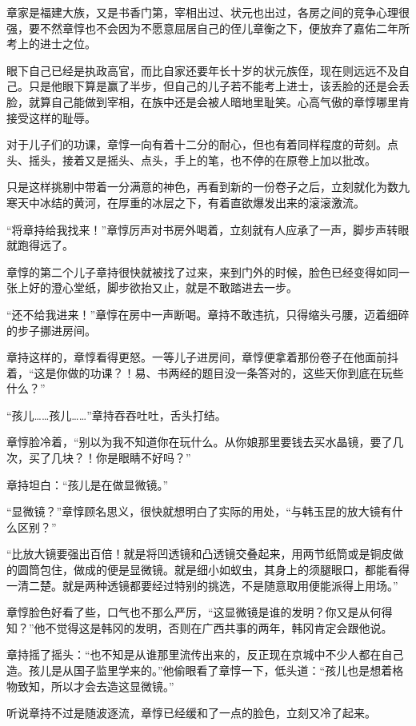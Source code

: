 章家是福建大族，又是书香门第，宰相出过、状元也出过，各房之间的竞争心理很强，要不然章惇也不会因为不愿意屈居自己的侄儿章衡之下，便放弃了嘉佑二年所考上的进士之位。

眼下自己已经是执政高官，而比自家还要年长十岁的状元族侄，现在则远远不及自己。只是他眼下算是赢了半步，但自己的儿子若不能考上进士，该丢脸的还是会丢脸，就算自己能做到宰相，在族中还是会被人暗地里耻笑。心高气傲的章惇哪里肯接受这样的耻辱。

对于儿子们的功课，章惇一向有着十二分的耐心，但也有着同样程度的苛刻。点头、摇头，接着又是摇头、点头，手上的笔，也不停的在原卷上加以批改。

只是这样挑剔中带着一分满意的神色，再看到新的一份卷子之后，立刻就化为数九寒天中冰结的黄河，在厚重的冰层之下，有着直欲爆发出来的滚滚激流。

“将章持给我找来！”章惇厉声对书房外喝着，立刻就有人应承了一声，脚步声转眼就跑得远了。

章惇的第二个儿子章持很快就被找了过来，来到门外的时候，脸色已经变得如同一张上好的澄心堂纸，脚步欲抬又止，就是不敢踏进去一步。

“还不给我进来！”章惇在房中一声断喝。章持不敢违抗，只得缩头弓腰，迈着细碎的步子挪进房间。

章持这样的，章惇看得更怒。一等儿子进房间，章惇便拿着那份卷子在他面前抖着，“这是你做的功课？！易、书两经的题目没一条答对的，这些天你到底在玩些什么？”

“孩儿……孩儿……”章持吞吞吐吐，舌头打结。

章惇脸冷着，“别以为我不知道你在玩什么。从你娘那里要钱去买水晶镜，要了几次，买了几块？！你是眼睛不好吗？”

章持坦白：“孩儿是在做显微镜。”

“显微镜？”章惇顾名思义，很快就想明白了实际的用处，“与韩玉昆的放大镜有什么区别？”

“比放大镜要强出百倍！就是将凹透镜和凸透镜交叠起来，用两节纸筒或是铜皮做的圆筒包住，做成的便是显微镜。就是细小如蚁虫，其身上的须腿眼口，都能看得一清二楚。就是两种透镜都要经过特别的挑选，不是随意取用便能派得上用场。”

章惇脸色好看了些，口气也不那么严厉，“这显微镜是谁的发明？你又是从何得知？”他不觉得这是韩冈的发明，否则在广西共事的两年，韩冈肯定会跟他说。

章持摇了摇头：“也不知是从谁那里流传出来的，反正现在京城中不少人都在自己造。孩儿是从国子监里学来的。”他偷眼看了章惇一下，低头道：“孩儿也是想着格物致知，所以才会去造这显微镜。”

听说章持不过是随波逐流，章惇已经缓和了一点的脸色，立刻又冷了起来。


